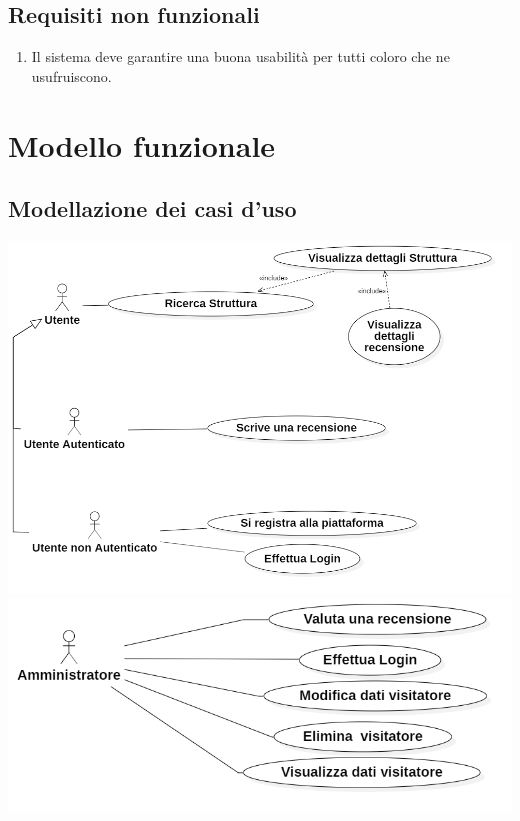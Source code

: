 \section{Requisiti non funzionali}
\begin{enumerate}
    \item Il sistema deve garantire una buona usabilità per tutti coloro che ne usufruiscono.
\end{enumerate}
\chapter{Modello funzionale}

\section{Modellazione dei casi d'uso}

\includegraphics[scale=0.4]{Usecase/ucd2.png}
\includegraphics[scale=0.4]{Usecase/ucd1.png}


